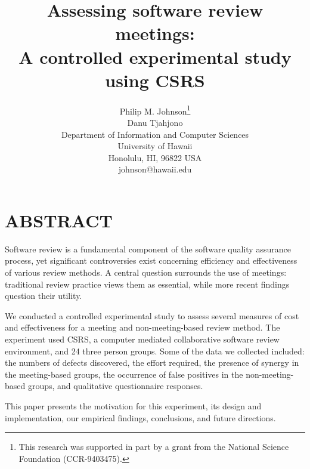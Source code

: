 



\title{Assessing software review meetings: \\ A controlled experimental study using CSRS}

\author{
        \hspace*{-4ex}
        \parbox{4.6in} {\begin{center}
        {\authornamefont Philip M. Johnson\thanks{This research was supported
in part by a grant  from the National Science Foundation (CCR-9403475).}}\\ 
        {\authornamefont Danu Tjahjono}\\
        Department of Information and Computer Sciences\\
        University of Hawaii\\
        Honolulu, HI, 96822 USA\\
        johnson@hawaii.edu
        \end{center} }
      }

\maketitle
\copyrightspace
\section{ABSTRACT}

Software review is a fundamental component of the software quality
assurance process, yet significant controversies exist concerning
efficiency and effectiveness of various review methods. A central question
surrounds the use of meetings: traditional review practice views them as
essential, while more recent findings question their utility.

We conducted a controlled experimental study to assess several measures of
cost and effectiveness for a meeting and non-meeting-based review method.
The experiment used CSRS, a computer mediated collaborative software review
environment, and 24 three person groups.  Some of the data we collected
included: the numbers of defects discovered, the effort required, the
presence of synergy in the meeting-based groups, the occurrence of false
positives in the non-meeting-based groups, and qualitative questionnaire
responses.

This paper presents the motivation for this experiment, its design and
implementation, our empirical findings, conclusions, and future directions.


